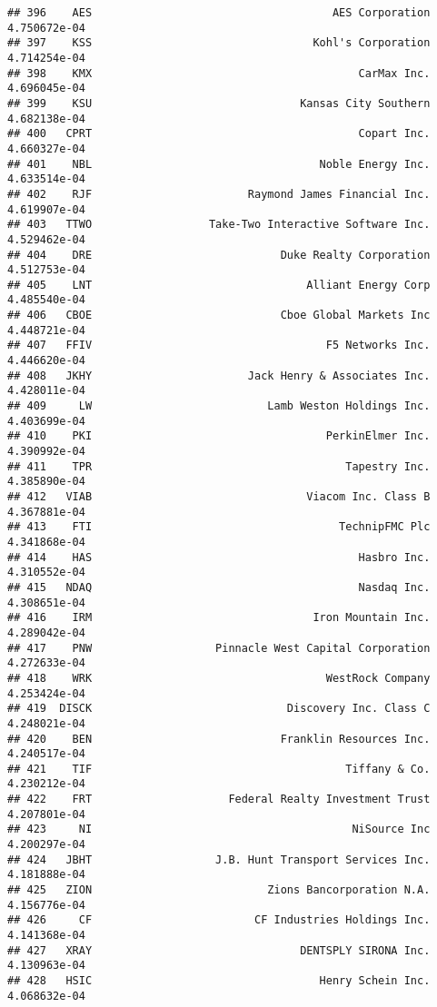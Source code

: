 \documentclass[
]{article}
\begin{document}
\begin{verbatim}
## 396    AES                                     AES Corporation 4.750672e-04
## 397    KSS                                  Kohl's Corporation 4.714254e-04
## 398    KMX                                         CarMax Inc. 4.696045e-04
## 399    KSU                                Kansas City Southern 4.682138e-04
## 400   CPRT                                         Copart Inc. 4.660327e-04
## 401    NBL                                   Noble Energy Inc. 4.633514e-04
## 402    RJF                        Raymond James Financial Inc. 4.619907e-04
## 403   TTWO                  Take-Two Interactive Software Inc. 4.529462e-04
## 404    DRE                             Duke Realty Corporation 4.512753e-04
## 405    LNT                                 Alliant Energy Corp 4.485540e-04
## 406   CBOE                             Cboe Global Markets Inc 4.448721e-04
## 407   FFIV                                    F5 Networks Inc. 4.446620e-04
## 408   JKHY                        Jack Henry & Associates Inc. 4.428011e-04
## 409     LW                           Lamb Weston Holdings Inc. 4.403699e-04
## 410    PKI                                    PerkinElmer Inc. 4.390992e-04
## 411    TPR                                       Tapestry Inc. 4.385890e-04
## 412   VIAB                                 Viacom Inc. Class B 4.367881e-04
## 413    FTI                                      TechnipFMC Plc 4.341868e-04
## 414    HAS                                         Hasbro Inc. 4.310552e-04
## 415   NDAQ                                         Nasdaq Inc. 4.308651e-04
## 416    IRM                                  Iron Mountain Inc. 4.289042e-04
## 417    PNW                   Pinnacle West Capital Corporation 4.272633e-04
## 418    WRK                                    WestRock Company 4.253424e-04
## 419  DISCK                              Discovery Inc. Class C 4.248021e-04
## 420    BEN                             Franklin Resources Inc. 4.240517e-04
## 421    TIF                                       Tiffany & Co. 4.230212e-04
## 422    FRT                     Federal Realty Investment Trust 4.207801e-04
## 423     NI                                        NiSource Inc 4.200297e-04
## 424   JBHT                   J.B. Hunt Transport Services Inc. 4.181888e-04
## 425   ZION                           Zions Bancorporation N.A. 4.156776e-04
## 426     CF                         CF Industries Holdings Inc. 4.141368e-04
## 427   XRAY                                DENTSPLY SIRONA Inc. 4.130963e-04
## 428   HSIC                                   Henry Schein Inc. 4.068632e-04

\end{verbatim}
\end{document}
